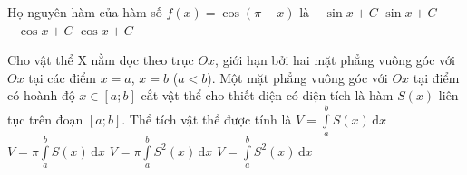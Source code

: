 \caulc
\begin{ex}%
	Họ nguyên hàm của hàm số $f(x)=\cos(\pi - x)$ là
	\choice
	{\True $-\sin x + C$}
	{$\sin x + C$}
	{$-\cos x + C$}
	{$\cos x + C$}
\end{ex}

\begin{ex}%
	Cho vật thể X nằm dọc theo trục $Ox$, giới hạn bởi hai mặt phẳng vuông góc với $Ox$ tại các điểm $x=a$, $x=b$ ($a < b$). Một mặt phẳng vuông góc với $Ox$ tại điểm có hoành độ $x \in [a;b]$ cắt vật thể cho thiết diện có diện tích là hàm $S(x)$ liên tục trên đoạn $[a;b]$. Thể tích vật thể được tính là
	\choice
	{\True $V = \displaystyle\int\limits_a^b S(x)\mathrm{\,d}x$}
	{$V = \displaystyle\pi \int\limits_a^b S(x)\mathrm{\,d}x$}
	{$V = \pi \displaystyle\int\limits_a^b S^2(x)\mathrm{\,d}x$}
	{$V = \displaystyle\int\limits_a^b S^2(x)\mathrm{\,d}x$}
\end{ex}

